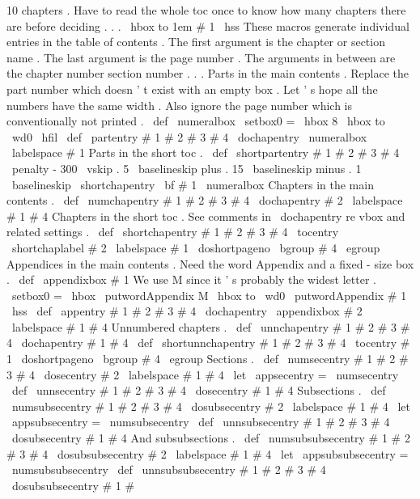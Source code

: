 {{{{{10
%
chapters
.
Have
to
read
the
whole
toc
once
to
know
how
many
chapters
%
there
are
before
deciding
.
.
.
\
hbox
to
1em
{
#
1
\
hss
}
%
}
%
These
macros
generate
individual
entries
in
the
table
of
contents
.
%
The
first
argument
is
the
chapter
or
section
name
.
%
The
last
argument
is
the
page
number
.
%
The
arguments
in
between
are
the
chapter
number
section
number
.
.
.
%
Parts
in
the
main
contents
.
Replace
the
part
number
which
doesn
'
t
%
exist
with
an
empty
box
.
Let
'
s
hope
all
the
numbers
have
the
same
width
.
%
Also
ignore
the
page
number
which
is
conventionally
not
printed
.
\
def
\
numeralbox
{
\
setbox0
=
\
hbox
{
8
}
\
hbox
to
\
wd0
{
\
hfil
}
}
\
def
\
partentry
#
1
#
2
#
3
#
4
{
\
dochapentry
{
\
numeralbox
\
labelspace
#
1
}
{
}
}
%
%
Parts
in
the
short
toc
.
\
def
\
shortpartentry
#
1
#
2
#
3
#
4
{
%
\
penalty
-
300
\
vskip
.
5
\
baselineskip
plus
.
15
\
baselineskip
minus
.
1
\
baselineskip
\
shortchapentry
{
{
\
bf
#
1
}
}
{
\
numeralbox
}
{
}
{
}
%
}
%
Chapters
in
the
main
contents
.
\
def
\
numchapentry
#
1
#
2
#
3
#
4
{
\
dochapentry
{
#
2
\
labelspace
#
1
}
{
#
4
}
}
%
%
Chapters
in
the
short
toc
.
%
See
comments
in
\
dochapentry
re
vbox
and
related
settings
.
\
def
\
shortchapentry
#
1
#
2
#
3
#
4
{
%
\
tocentry
{
\
shortchaplabel
{
#
2
}
\
labelspace
#
1
}
{
\
doshortpageno
\
bgroup
#
4
\
egroup
}
%
}
%
Appendices
in
the
main
contents
.
%
Need
the
word
Appendix
and
a
fixed
-
size
box
.
%
\
def
\
appendixbox
#
1
{
%
%
We
use
M
since
it
'
s
probably
the
widest
letter
.
\
setbox0
=
\
hbox
{
\
putwordAppendix
{
}
M
}
%
\
hbox
to
\
wd0
{
\
putwordAppendix
{
}
#
1
\
hss
}
}
%
\
def
\
appentry
#
1
#
2
#
3
#
4
{
\
dochapentry
{
\
appendixbox
{
#
2
}
\
labelspace
#
1
}
{
#
4
}
}
%
Unnumbered
chapters
.
\
def
\
unnchapentry
#
1
#
2
#
3
#
4
{
\
dochapentry
{
#
1
}
{
#
4
}
}
\
def
\
shortunnchapentry
#
1
#
2
#
3
#
4
{
\
tocentry
{
#
1
}
{
\
doshortpageno
\
bgroup
#
4
\
egroup
}
}
%
Sections
.
\
def
\
numsecentry
#
1
#
2
#
3
#
4
{
\
dosecentry
{
#
2
\
labelspace
#
1
}
{
#
4
}
}
\
let
\
appsecentry
=
\
numsecentry
\
def
\
unnsecentry
#
1
#
2
#
3
#
4
{
\
dosecentry
{
#
1
}
{
#
4
}
}
%
Subsections
.
\
def
\
numsubsecentry
#
1
#
2
#
3
#
4
{
\
dosubsecentry
{
#
2
\
labelspace
#
1
}
{
#
4
}
}
\
let
\
appsubsecentry
=
\
numsubsecentry
\
def
\
unnsubsecentry
#
1
#
2
#
3
#
4
{
\
dosubsecentry
{
#
1
}
{
#
4
}
}
%
And
subsubsections
.
\
def
\
numsubsubsecentry
#
1
#
2
#
3
#
4
{
\
dosubsubsecentry
{
#
2
\
labelspace
#
1
}
{
#
4
}
}
\
let
\
appsubsubsecentry
=
\
numsubsubsecentry
\
def
\
unnsubsubsecentry
#
1
#
2
#
3
#
4
{
\
dosubsubsecentry
{
#
1
}
{
#
}}}}}}
